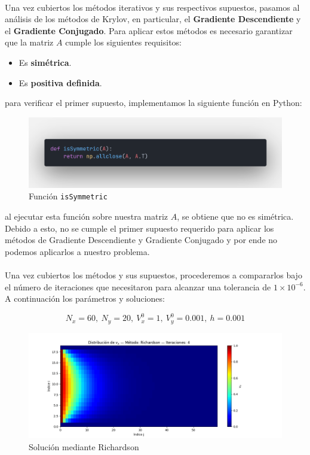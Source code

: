 \documentclass{article}
\begin{document}
  \paragraph{}
  Una vez cubiertos los métodos iterativos y sus respectivos supuestos, pasamos al análisis de los métodos de Krylov, en particular, el \textbf{Gradiente Descendiente} y el \textbf{Gradiente Conjugado}. Para aplicar estos métodos es necesario garantizar que la matriz $A$ cumple los siguientes requisitos:

  \begin{itemize}
      \item Es \textbf{simétrica}.
      \item Es \textbf{positiva definida}.
  \end{itemize}

  para verificar el primer supuesto, implementamos la siguiente función en Python:

  \begin{figure}[H]
      \centering
      \includegraphics[width=1\textwidth]{isSymmetric.png}
      \caption{Función \texttt{isSymmetric}}
  \end{figure}

  al ejecutar esta función sobre nuestra matriz $A$, se obtiene que no es simétrica. Debido a esto, no se cumple el primer supuesto requerido para aplicar los métodos de Gradiente Descendiente y Gradiente Conjugado y por ende no podemos aplicarlos a nuestro problema.

  \paragraph{}
  Una vez cubiertos los métodos y sus supuestos, procederemos a compararlos bajo el número de iteraciones que necesitaron para alcanzar una tolerancia de $1\times10^{-6}$. A continuación los parámetros y soluciones:

  \[N_x=60, \ N_y=20, \ V_x^0=1, \ V_y^0=0.001, \ h=0.001\]

  \begin{figure}[H]
      \centering
      \includegraphics[width=1.2\textwidth]{Richardson.png}
      \caption{Solución mediante Richardson}
  \end{figure}
\end{document}
